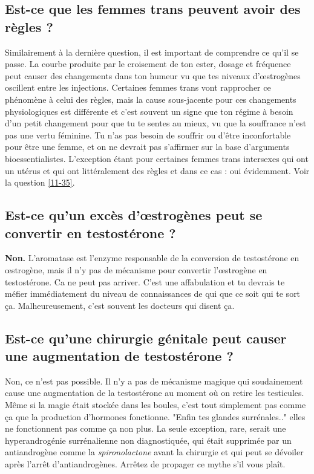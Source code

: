 \documentclass{article}
\begin{document}
\subsection{Est-ce que les femmes trans peuvent avoir des règles ?}

Similairement à la dernière question, il est important de comprendre ce qu'il se passe. La courbe produite par le croisement de ton ester, dosage et fréquence peut causer des changements dans ton humeur vu que tes niveaux d'œstrogènes oscillent entre les injections. Certaines femmes trans vont rapprocher ce phénomène à celui des règles, mais la cause sous-jacente pour ces changements physiologiques est différente et c'est souvent un signe que ton régime à besoin d'un petit changement pour que tu te sentes au mieux, vu que la souffrance n'est pas une vertu féminine. Tu n'as pas besoin de souffrir ou d'être inconfortable pour être une femme, et on ne devrait pas s'affirmer sur la base d'arguments bioessentialistes. L'exception étant pour certaines femmes trans intersexes qui ont un utérus et qui ont littéralement des règles et dans ce cas : oui évidemment. Voir la question \ref{11-35}.

\subsection{Est-ce qu'un excès d'œstrogènes peut se convertir en testostérone ?}

\textbf{Non.} L'aromatase est l'enzyme responsable de la conversion de testostérone en œstrogène, mais il n'y pas de mécanisme pour convertir l'œstrogène en testostérone. Ca ne peut pas arriver. C'est une affabulation et tu devrais te méfier immédiatement du niveau de connaissances de qui que ce soit qui te sort ça. Malheureusement, c'est souvent les docteurs qui disent ça.

\subsection{Est-ce qu'une chirurgie génitale peut causer une augmentation de testostérone ?}

Non, ce n'est pas possible. Il n'y a pas de mécanisme magique qui soudainement cause une augmentation de la testostérone au moment où on retire les testicules. Même si la magie était stockée dans les boules, c'est tout simplement pas comme ça que la production d'hormones fonctionne. "Enfin tes glandes surrénales.." elles ne fonctionnent pas comme ça non plus. La seule exception, rare, serait une hyperandrogénie surrénalienne non diagnostiquée, qui était supprimée par un antiandrogène comme la \textit{spironolactone} avant la chirurgie et qui peut se dévoiler après l'arrêt d'antiandrogènes. Arrêtez de propager ce mythe s'il vous plaît.
\end{document}
